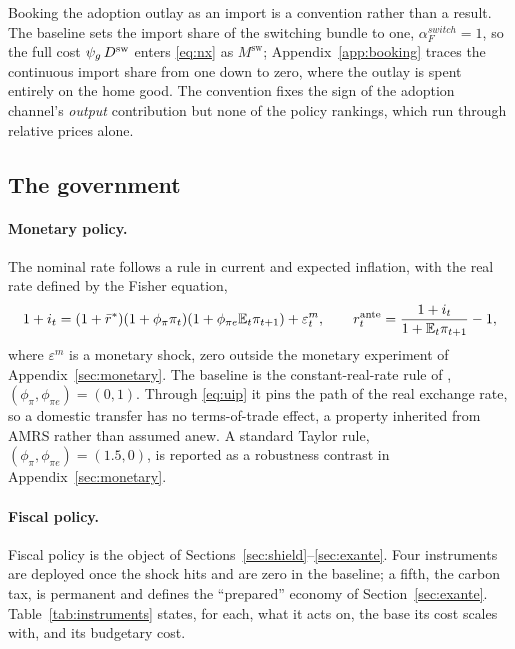 Booking the adoption outlay as an import is a convention rather than a result. The
baseline sets the import share of the switching bundle to one,
$\alpha_F^{switch}=1$, so the full cost $\psi_g\,D^{\mathrm{sw}}$ enters \eqref{eq:nx} as
$M^{\mathrm{sw}}$; Appendix~\ref{app:booking} traces the continuous import share
from one down to zero, where the outlay is spent entirely on the home good. The
convention fixes the sign of the adoption channel's \emph{output} contribution
but none of the policy rankings, which run through relative prices alone.

\subsection{The government}\label{sec:gov}

\paragraph{Monetary policy.}
The nominal rate follows a rule in current and expected inflation, with the
real rate defined by the Fisher equation,
%
\begin{equation}
1+i_t=(1+\bar r^{*})(1+\phi_\pi\pi_t)(1+\phi_{\pi e}\mathbb{E}_t\pi_{t+1})+\varepsilon^m_t,
\qquad
r^{\mathrm{ante}}_t=\frac{1+i_t}{1+\mathbb{E}_t\pi_{t+1}}-1,
\label{eq:mp}
\end{equation}
%
where $\varepsilon^m$ is a monetary shock, zero outside the monetary
experiment of Appendix~\ref{sec:monetary}. The baseline is the constant-real-rate
rule of \citet{auclert2023energy}, $(\phi_\pi,\phi_{\pi e})=(0,1)$. Through \eqref{eq:uip} it
pins the path of the real exchange rate, so a domestic transfer has no
terms-of-trade effect, a property inherited from AMRS rather than assumed anew. A standard
Taylor rule, $(\phi_\pi,\phi_{\pi e})=(1.5,0)$, is reported as a robustness
contrast in Appendix~\ref{sec:monetary}.

\paragraph{Fiscal policy.}
Fiscal policy is the object of Sections~\ref{sec:shield}--\ref{sec:exante}. Four
instruments are deployed once the shock hits and are zero in the baseline; a
fifth, the carbon tax, is permanent and defines the ``prepared'' economy of
Section~\ref{sec:exante}. Table~\ref{tab:instruments} states,
for each, what it acts on, the base its cost scales with, and its budgetary cost.

